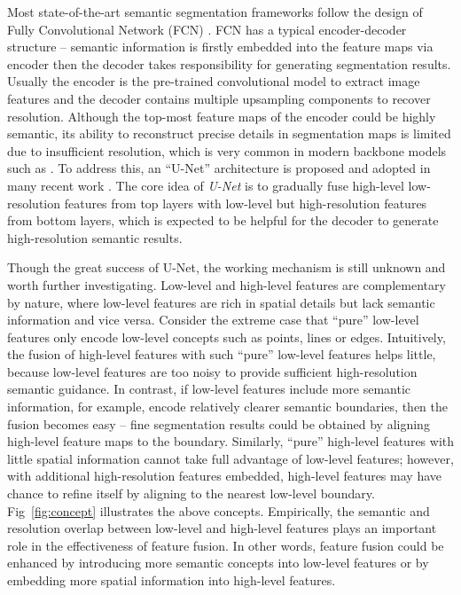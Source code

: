 \documentclass[runningheads]{llncs}
\begin{document}
Most state-of-the-art semantic segmentation frameworks \cite{Chen2016DeepLab,Ghiasi2016Laplacian,Badrinarayanan2017SegNet,Yu2015Multi,Chen2017Rethinking,Islam_2017_CVPR,Ronneberger2015U,Peng2017Large,Wang2017Understanding,Zhao2016Pyramid,Lin2016RefineNet,Chen2014Semantic} follow the design of Fully Convolutional Network (FCN) \cite{Long2015Fully}. FCN has a typical encoder-decoder structure -- semantic information is firstly embedded into the feature maps via encoder then the decoder takes responsibility for generating segmentation results. Usually the encoder is the pre-trained convolutional model to extract image features and the decoder contains multiple upsampling components to recover resolution. Although the top-most feature maps of the encoder could be highly semantic, its ability to reconstruct precise details in segmentation maps is limited due to insufficient resolution, which is very common in modern backbone models such as \cite{He2016Deep,Szegedy2015Going,Krizhevsky2012ImageNet,He2016Identity,Xie2016Aggregated,Simonyan2014Very}. To address this, an ``U-Net'' architecture is proposed \cite{Ronneberger2015U} and adopted in many recent work \cite{Ghiasi2016Laplacian,Islam_2017_CVPR,Ronneberger2015U,Peng2017Large,Long2015Fully,Lin2016RefineNet}. The core idea of \emph{U-Net} is to gradually fuse high-level low-resolution features from top layers with low-level but high-resolution features from bottom layers, which is expected to be helpful for the decoder to generate high-resolution semantic results.

Though the great success of U-Net, the working mechanism is still unknown and worth further investigating. Low-level and high-level features are complementary by nature, where low-level features are rich in spatial details but lack semantic information and vice versa. Consider the extreme case that ``pure'' low-level features only encode low-level concepts such as points, lines or edges. Intuitively, the fusion of high-level features with such ``pure'' low-level features helps little, because low-level features are too noisy to provide sufficient high-resolution semantic guidance. In contrast, if low-level features include more semantic information, for example, encode relatively clearer semantic boundaries, then the fusion becomes easy -- fine segmentation results could be obtained by aligning high-level feature maps to the boundary. Similarly, ``pure'' high-level features with little spatial information cannot take full advantage of low-level features; however, with additional high-resolution features embedded, high-level features may have chance to refine itself by aligning to the nearest low-level boundary. Fig~\ref{fig:concept} illustrates the above concepts. Empirically, the semantic and resolution overlap between low-level and high-level features plays an important role in the effectiveness of feature fusion. In other words, feature fusion could be enhanced by introducing more semantic concepts into low-level features or by embedding more spatial information into high-level features.
\end{document}
